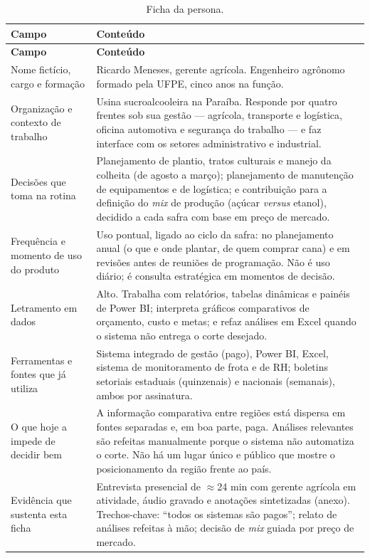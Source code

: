 \documentclass[11pt,a4paper]{article}
\begin{document}
\begin{longtable}{L{4.2cm} L{11.2cm}}
\caption{Ficha da persona.}\label{tab:persona}\\
\toprule
\textbf{Campo} & \textbf{Conteúdo}\\
\midrule
\endfirsthead
\toprule
\textbf{Campo} & \textbf{Conteúdo}\\
\midrule
\endhead
\bottomrule
\endfoot
Nome fictício, cargo e formação &
Ricardo Meneses, gerente agrícola. Engenheiro agrônomo formado pela UFPE, cinco anos na
função.\\
\addlinespace
Organização e contexto de trabalho &
Usina sucroalcooleira na Paraíba. Responde por quatro frentes sob sua gestão — agrícola,
transporte e logística, oficina automotiva e segurança do trabalho — e faz interface com os
setores administrativo e industrial.\\
\addlinespace
Decisões que toma na rotina &
Planejamento de plantio, tratos culturais e manejo da colheita (de agosto a março);
planejamento de manutenção de equipamentos e de logística; e contribuição para a definição
do \textit{mix} de produção (açúcar \textit{versus} etanol), decidido a cada safra com base
em preço de mercado.\\
\addlinespace
Frequência e momento de uso do produto &
Uso pontual, ligado ao ciclo da safra: no planejamento anual (o que e onde plantar, de quem
comprar cana) e em revisões antes de reuniões de programação. Não é uso diário; é consulta
estratégica em momentos de decisão.\\
\addlinespace
Letramento em dados &
Alto. Trabalha com relatórios, tabelas dinâmicas e painéis de Power BI; interpreta gráficos
comparativos de orçamento, custo e metas; e refaz análises em Excel quando o sistema não
entrega o corte desejado.\\
\addlinespace
Ferramentas e fontes que já utiliza &
Sistema integrado de gestão (pago), Power BI, Excel, sistema de monitoramento de frota e de
RH; boletins setoriais estaduais (quinzenais) e nacionais (semanais), ambos por assinatura.\\
\addlinespace
O que hoje a impede de decidir bem &
A informação comparativa entre regiões está dispersa em fontes separadas e, em boa parte,
paga. Análises relevantes são refeitas manualmente porque o sistema não automatiza o corte.
Não há um lugar único e público que mostre o posicionamento da região frente ao país.\\
\addlinespace
Evidência que sustenta esta ficha &
Entrevista presencial de $\approx$24 min com gerente agrícola em atividade, áudio gravado e
anotações sintetizadas (anexo). Trechos-chave: ``todos os sistemas são pagos''; relato de
análises refeitas à mão; decisão de \textit{mix} guiada por preço de mercado.\\
\end{longtable}
\end{document}
